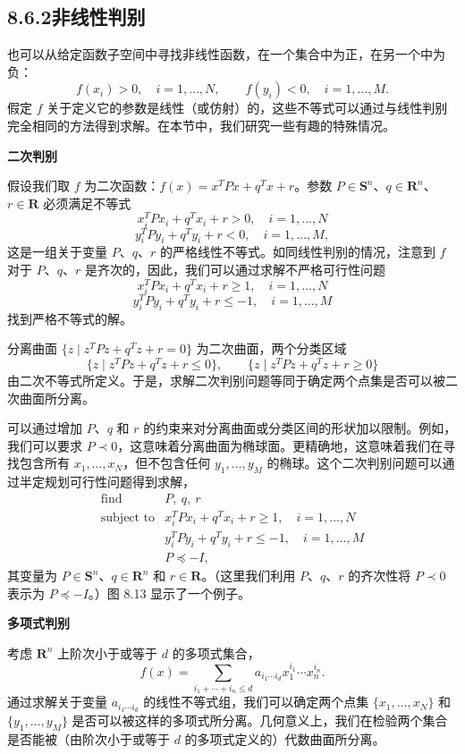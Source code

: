 \documentclass[UTF8, 12pt, fontset=fandol, oneside]{ctexart}
\begin{document}
\subsection*{8.6.2\quad 非线性判别}

也可以从给定函数子空间中寻找非线性函数，在一个集合中为正，在另一个中为负：
\[
f(x_i)>0,\quad i=1,\ldots,N,\qquad f(y_i)<0,\quad i=1,\ldots,M.
\]
假定 $f$ 关于定义它的参数是线性（或仿射）的，这些不等式可以通过与线性判别完全相同的方法得到求解。在本节中，我们研究一些有趣的特殊情况。

\noindent\textbf{二次判别}

假设我们取 $f$ 为二次函数：$f(x)=x^TPx+q^Tx+r$。参数 $P\in\mathbf{S}^n$、$q\in\mathbf{R}^n$、$r\in\mathbf{R}$ 必须满足不等式
\[
x_i^TPx_i+q^Tx_i+r>0,\quad i=1,\ldots,N
\]
\[
y_i^TPy_i+q^Ty_i+r<0,\quad i=1,\ldots,M,
\]
这是一组关于变量 $P$、$q$、$r$ 的严格线性不等式。如同线性判别的情况，注意到 $f$ 对于 $P$、$q$、$r$ 是齐次的，因此，我们可以通过求解不严格可行性问题
\[
x_i^TPx_i+q^Tx_i+r\geq 1,\quad i=1,\ldots,N
\]
\[
y_i^TPy_i+q^Ty_i+r\leq -1,\quad i=1,\ldots,M
\]
找到严格不等式的解。

分离曲面 $\{z\mid z^TPz+q^Tz+r=0\}$ 为二次曲面，两个分类区域
\[
\{z\mid z^TPz+q^Tz+r\leq 0\},\qquad
\{z\mid z^TPz+q^Tz+r\geq 0\}
\]
由二次不等式所定义。于是，求解二次判别问题等同于确定两个点集是否可以被二次曲面所分离。

可以通过增加 $P$、$q$ 和 $r$ 的约束来对分离曲面或分类区间的形状加以限制。例如，我们可以要求 $P\prec 0$，这意味着分离曲面为椭球面。更精确地，这意味着我们在寻找包含所有 $x_1,\ldots,x_N$，但不包含任何 $y_1,\ldots,y_M$ 的椭球。这个二次判别问题可以通过半定规划可行性问题得到求解，
\[
\begin{array}{ll}
\mbox{find} & P,\ q,\ r\\
\mbox{subject to} & x_i^TPx_i+q^Tx_i+r\geq 1,\quad i=1,\ldots,N\\
& y_i^TPy_i+q^Ty_i+r\leq -1,\quad i=1,\ldots,M\\
& P\preceq -I,
\end{array}
\]
其变量为 $P\in\mathbf{S}^n$、$q\in\mathbf{R}^n$ 和 $r\in\mathbf{R}$。（这里我们利用 $P$、$q$、$r$ 的齐次性将 $P\prec 0$ 表示为 $P\preceq -I$。）图 8.13 显示了一个例子。

\noindent\textbf{多项式判别}

考虑 $\mathbf{R}^n$ 上阶次小于或等于 $d$ 的多项式集合，
\[
f(x)=\sum_{i_1+\cdots+i_n\leq d} a_{i_1\cdots i_d}x_1^{i_1}\cdots x_n^{i_n}.
\]
通过求解关于变量 $a_{i_1\cdots i_d}$ 的线性不等式组，我们可以确定两个点集 $\{x_1,\ldots,x_N\}$ 和 $\{y_1,\ldots,y_M\}$ 是否可以被这样的多项式所分离。几何意义上，我们在检验两个集合是否能被（由阶次小于或等于 $d$ 的多项式定义的）代数曲面所分离。
\end{document}
